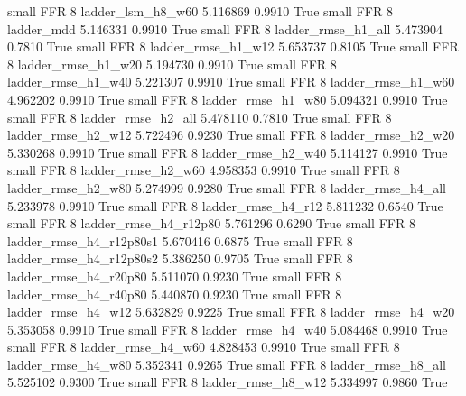      small      FFR                 8        ladder_lsm_h8_w60   5.116869      0.9910    True
     small      FFR                 8               ladder_mdd   5.146331      0.9910    True
     small      FFR                 8       ladder_rmse_h1_all   5.473904      0.7810    True
     small      FFR                 8       ladder_rmse_h1_w12   5.653737      0.8105    True
     small      FFR                 8       ladder_rmse_h1_w20   5.194730      0.9910    True
     small      FFR                 8       ladder_rmse_h1_w40   5.221307      0.9910    True
     small      FFR                 8       ladder_rmse_h1_w60   4.962202      0.9910    True
     small      FFR                 8       ladder_rmse_h1_w80   5.094321      0.9910    True
     small      FFR                 8       ladder_rmse_h2_all   5.478110      0.7810    True
     small      FFR                 8       ladder_rmse_h2_w12   5.722496      0.9230    True
     small      FFR                 8       ladder_rmse_h2_w20   5.330268      0.9910    True
     small      FFR                 8       ladder_rmse_h2_w40   5.114127      0.9910    True
     small      FFR                 8       ladder_rmse_h2_w60   4.958353      0.9910    True
     small      FFR                 8       ladder_rmse_h2_w80   5.274999      0.9280    True
     small      FFR                 8       ladder_rmse_h4_all   5.233978      0.9910    True
     small      FFR                 8       ladder_rmse_h4_r12   5.811232      0.6540    True
     small      FFR                 8    ladder_rmse_h4_r12p80   5.761296      0.6290    True
     small      FFR                 8  ladder_rmse_h4_r12p80s1   5.670416      0.6875    True
     small      FFR                 8  ladder_rmse_h4_r12p80s2   5.386250      0.9705    True
     small      FFR                 8    ladder_rmse_h4_r20p80   5.511070      0.9230    True
     small      FFR                 8    ladder_rmse_h4_r40p80   5.440870      0.9230    True
     small      FFR                 8       ladder_rmse_h4_w12   5.632829      0.9225    True
     small      FFR                 8       ladder_rmse_h4_w20   5.353058      0.9910    True
     small      FFR                 8       ladder_rmse_h4_w40   5.084468      0.9910    True
     small      FFR                 8       ladder_rmse_h4_w60   4.828453      0.9910    True
     small      FFR                 8       ladder_rmse_h4_w80   5.352341      0.9265    True
     small      FFR                 8       ladder_rmse_h8_all   5.525102      0.9300    True
     small      FFR                 8       ladder_rmse_h8_w12   5.334997      0.9860    True
